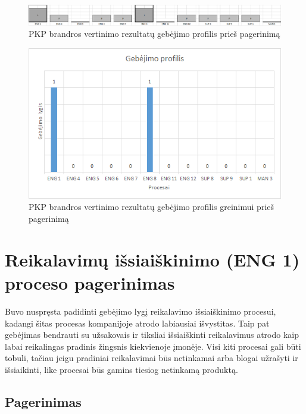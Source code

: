 \documentclass{VUMIFPSkursinis}
\begin{document}
	\begin{figure}[!htbp]
		\includegraphics[scale=0.45]{img/ProfilisPries}
		\caption{PKP brandros vertinimo rezultatų gebėjimo profilis prieš pagerinimą} %
		\label{img:ProfilisPries}
	\end{figure}

	\begin{figure}[!htbp]
		\includegraphics[scale=1]{img/DiagramaProfilisPries}
		\caption{PKP brandros vertinimo rezultatų gebėjimo profilis greinimui prieš pagerinimą} %
		\label{img:DiagramaProfilisPries}
	\end{figure}

\section{Reikalavimų išsiaiškinimo (ENG 1) proceso pagerinimas}

	Buvo nuspręsta padidinti gebėjimo lygį reikalavimo išsiaiškinimo procesui, kadangi šitas procesas kompanijoje atrodo labiausiai išvystitas.
	Taip pat gebėjimas bendrauti su užsakovais ir tiksliai išsiaiškinti reikalavimus atrodo kaip labai reikalingas pradinis žingsnis kiekvienoje įmonėje.
	Visi kiti procesai gali būti tobuli, tačiau jeigu pradiniai reikalavimai būs netinkamai arba blogai užrašyti ir išsiaikinti, like procesai būs gamins tiesiog netinkamą produktą.

\subsection{Pagerinimas}
\end{document}
